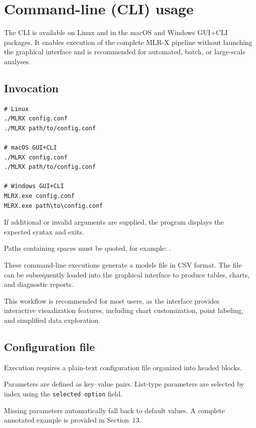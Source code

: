 \documentclass[11pt,a4paper]{article}
\begin{document}
\section{Command-line (CLI) usage}

The CLI is available on Linux and in the macOS and Windows GUI+CLI packages. 
It enables execution of the complete MLR-X pipeline without launching the graphical interface and is recommended for automated, batch, or large-scale analyses.

\subsection{Invocation}

\begin{lstlisting}[style=mlrx]
# Linux
./MLRX config.conf
./MLRX path/to/config.conf

# macOS GUI+CLI
./MLRX config.conf
./MLRX path/to/config.conf

# Windows GUI+CLI
MLRX.exe config.conf
MLRX.exe path\to\config.conf
\end{lstlisting}

If additional or invalid arguments are supplied, the program displays the expected syntax and exits.

Paths containing spaces must be quoted, for example:
.

These command-line executions generate a models file in CSV format.  
The file can be subsequently loaded into the graphical interface to produce tables, charts, and diagnostic reports.

This workflow is recommended for most users, as the interface provides interactive visualization features, including chart customization, point labeling, and simplified data exploration.

\subsection{Configuration file}

Execution requires a plain-text configuration file organized into headed blocks.

Parameters are defined as key--value pairs.  
List-type parameters are selected by index using the \texttt{selected option} field.

Missing parameters automatically fall back to default values.  
A complete annotated example is provided in Section~13.
\end{document}
